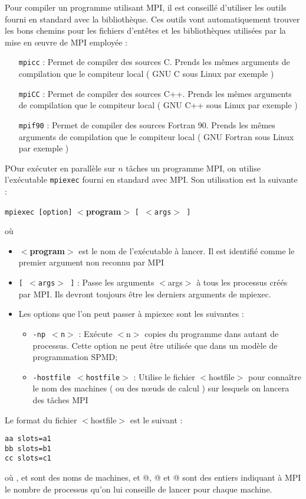 \documentclass[11pt,a4paper]{article}
\begin{document}
Pour compiler un programme utilisant MPI, il est conseillé d'utiliser les outils fourni en standard avec la
bibliothèque. Ces outils vont automatiquement trouver les bons chemins pour les fichiers d'entêtes et les bibliothèques
utilisées par la mise en {\oe}uvre de MPI employée :
\begin{itemize}
\item[\texttt{mpicc}] : Permet de compiler des sources C. Prends les mêmes arguments de compilation que le compiteur local ( GNU C sous Linux par exemple )
\item[\texttt{mpiCC}] : Permet de compiler des sources C++. Prends les mêmes arguments de compilation que le compiteur local ( GNU C++ sous Linux par exemple )
\item[\texttt{mpif90}] : Permet de compiler des sources Fortran 90. Prends les mêmes arguments de compilation que le compiteur local ( GNU Fortran sous Linux par exemple )
\end{itemize}

POur exécuter en parallèle sur $n$ tâches un programme MPI, on utilise l'exécutable \texttt{mpiexec} fourni en
standard avec MPI. Son utilisation est la suivante :

\texttt{mpiexec [option]} \textbf{$<$program$>$} \texttt{[ $<$args$>$ ]}

où
\begin{itemize}
\item \textbf{$<$program$>$} est le nom de l'exécutable à lancer. Il est identifié comme le premier argument non reconnu par MPI
\item \texttt{[ $<$args$>$ ]} : Passe les arguments $<$args$>$  à tous les processus créés par MPI. Ils devront toujours être les derniers arguments de mpiexec. 
\item Les options que l'on peut passer à mpiexec sont les suivantes :
\begin{itemize}
\item \texttt{-np $<$n$>$} : Exécute $<$n$>$ copies du programme dans autant de processus. Cette option ne peut être
utilisée que dans un modèle de programmation SPMD;
\item \texttt{-hostfile $<$hostfile$>$} : Utilise le fichier $<$hostfile$>$ pour connaître le nom des machines
( ou des n{\oe}uds de calcul ) sur lesquels on lancera des tâches MPI
\end{itemize}
\end{itemize}

Le format du fichier $<$hostfile$>$ est le suivant :
\begin{verbatim}
aa slots=a1
bb slots=b1
cc slots=c1
\end{verbatim}
où \verb@aa@, \verb@bb@ et \verb@cc@ sont des noms de machines, et @, @ et @ sont des entiers indiquant à MPI le nombre de processus qu'on lui conseille de lancer pour chaque machine.
\end{document}
